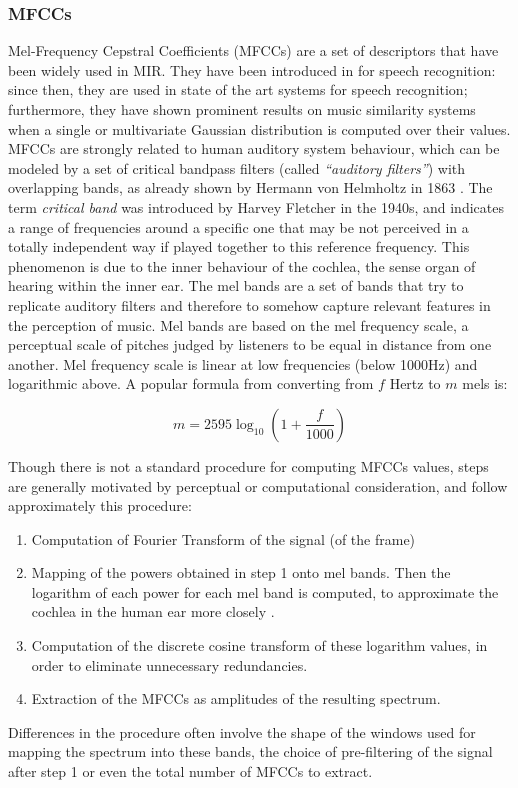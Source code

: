 \subsubsection{MFCCs}
Mel-Frequency Cepstral Coefficients (MFCCs) are a set of descriptors that have been widely used in MIR. They have been introduced in \cite{davis80} for speech recognition: since then, they are used in state of the art systems for speech recognition; furthermore, they have shown prominent results on music similarity systems when a single or multivariate Gaussian distribution is computed over their values. \\MFCCs are strongly related to human auditory system behaviour, which can be modeled by a set of critical bandpass filters (called \textit{``auditory filters''}) with overlapping bands, as already shown by Hermann von Helmholtz in 1863 \cite{helmholtz}. The term \textit{critical band} was introduced by Harvey Fletcher in the 1940s, and indicates a range of frequencies around a specific one that may be not perceived in a totally independent way if played together to this reference frequency. This phenomenon is due to the inner behaviour of the cochlea, the sense organ of hearing within the inner ear. The mel bands are a set of bands that try to replicate auditory filters and therefore to somehow capture relevant features in the perception of music. Mel bands are based on the mel frequency scale, a perceptual scale of pitches judged by listeners to be equal in distance from one another. Mel frequency scale is linear at low frequencies (below 1000Hz) and logarithmic above. A popular formula from converting from $f$ Hertz to $m$ mels is:

\begin{equation}
m = 2595\log_{10}\left(1 + \frac{f}{1000} \right)
\end{equation}

Though there is not a standard procedure for computing MFCCs values, steps are generally motivated by perceptual or computational consideration, and follow approximately this procedure:
\begin{enumerate}
\item Computation of Fourier Transform of the signal (of the frame)
\item Mapping of the powers obtained in step 1 onto mel bands. Then the logarithm of each power for each mel band is computed, to approximate the cochlea in the human ear more closely \cite{mirage07}.
\item Computation of the discrete cosine transform of these logarithm values, in order to eliminate unnecessary redundancies.
\item Extraction of the MFCCs as amplitudes of the resulting spectrum. 
\end{enumerate}
Differences in the procedure often involve the shape of the windows used for mapping the spectrum into these bands, the choice of pre-filtering of the signal after step 1 or even the total number of MFCCs to extract. 

